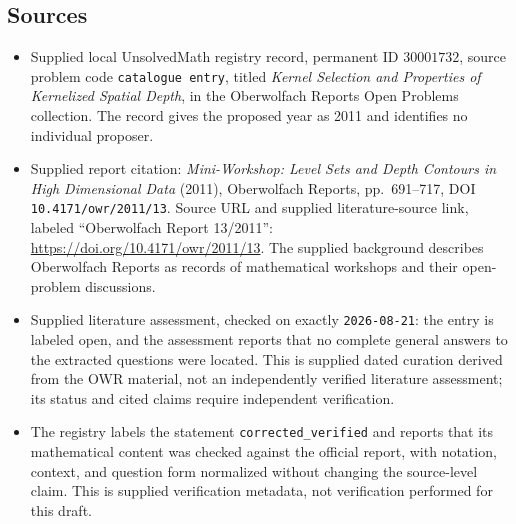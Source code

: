 \documentclass[11pt]{article}
\begin{document}
\subsection{Sources}
\begin{itemize}
\item Supplied local UnsolvedMath registry record, permanent ID \(30001732\), source problem code \texttt{catalogue entry}, titled \emph{Kernel Selection and Properties of Kernelized Spatial Depth}, in the Oberwolfach Reports Open Problems collection. The record gives the proposed year as 2011 and identifies no individual proposer.
\item Supplied report citation: \emph{Mini-Workshop: Level Sets and Depth Contours in High Dimensional Data} (2011), Oberwolfach Reports, pp.\ 691--717, DOI \texttt{10.4171/owr/2011/13}. Source URL and supplied literature-source link, labeled ``Oberwolfach Report 13/2011'': \url{https://doi.org/10.4171/owr/2011/13}. The supplied background describes Oberwolfach Reports as records of mathematical workshops and their open-problem discussions.
\item Supplied literature assessment, checked on exactly \texttt{2026-08-21}: the entry is labeled open, and the assessment reports that no complete general answers to the extracted questions were located. This is supplied dated curation derived from the OWR material, not an independently verified literature assessment; its status and cited claims require independent verification.
\item The registry labels the statement \texttt{corrected\_verified} and reports that its mathematical content was checked against the official report, with notation, context, and question form normalized without changing the source-level claim. This is supplied verification metadata, not verification performed for this draft.
\end{itemize}
\end{document}
